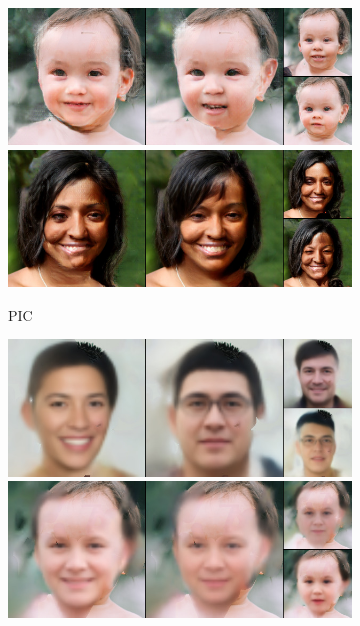 \begin{figure}[t]
\begin{subfigure}[t]{0.25\textwidth}
      \includegraphics[height=\ffhqimgheight]{figs/cigcvae/image-samples/ffhq256/freeform_pic_13_samples.jpg}
      \includegraphics[height=\ffhqimgheight]{figs/cigcvae/image-samples/ffhq256/freeform_pic_32_samples.jpg}
      \caption{\scriptsize PIC}
    \end{subfigure}
    \begin{subfigure}[t]{0.25\textwidth}
      \centering
      \includegraphics[height=\ffhqimgheight]{figs/cigcvae/image-samples/ffhq256/freeform_anp_0_samples.jpg}
      \includegraphics[height=\ffhqimgheight]{figs/cigcvae/image-samples/ffhq256/freeform_anp_13_samples.jpg}

\end{subfigure}
\end{figure}
